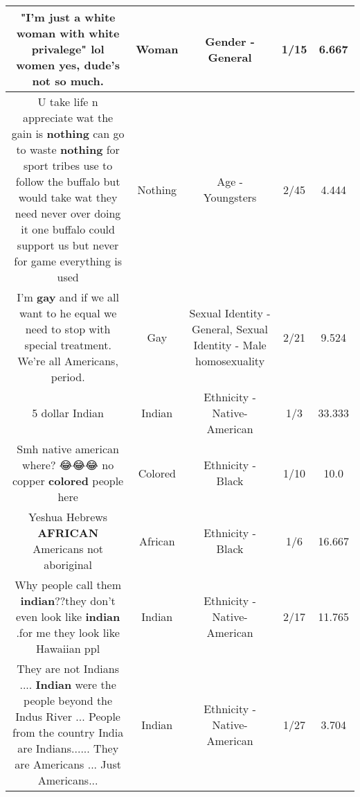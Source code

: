 \documentclass[11pt]{article}
\newlength\mylength
\begin{document}
\begin{center}
\begin{longtable}{|C{.65\mylength}|C{.30\mylength}|C{.12\mylength}|C{.12\mylength}|C{.12\mylength}|}
  \small "I'm just a white \textbf{woman} with white privalege" lol women yes, dude's not so much.\normalsize   & Woman & Gender - General & 1/15 & 6.667 \\  \hline
  \small U take life n appreciate wat the gain is \textbf{nothing} can go to waste \textbf{nothing} for sport tribes use to follow the buffalo but would take wat they need never over doing it one buffalo could support us but never for game everything is used\normalsize   & Nothing & Age - Youngsters & 2/45 & 4.444 \\  \hline
  \small I'm \textbf{g\textbf{ay}} and if we all want to he equal we need to stop with special treatment. We're all Americans, period.\normalsize   & Gay & Sexual Identity - General, Sexual Identity - Male homosexuality & 2/21 & 9.524 \\  \hline
  \small 5 dollar Indian\normalsize   & Indian & Ethnicity - Native-American & 1/3 & 33.333 \\  \hline
  \small Smh native american where? 😂😂😂 no copper \textbf{colored} people here\normalsize   & Colored & Ethnicity - Black & 1/10 & 10.0 \\  \hline
  \small Yeshua Hebrews \textbf{AFRICAN} Americans not aboriginal\normalsize   & African & Ethnicity - Black & 1/6 & 16.667 \\  \hline
  \small Why people call them \textbf{indian}??they don't even look like \textbf{indian} .for me they look like Hawaiian ppl\normalsize   & Indian & Ethnicity - Native-American & 2/17 & 11.765 \\  \hline
  \small They are not Indians .... \textbf{Indian} were the people beyond the Indus River ... People from the country India are Indians...... They are Americans ... Just Americans...\normalsize   & Indian & Ethnicity - Native-American & 1/27 & 3.704 \\  \hline

\end{longtable}
\end{center}
\end{document}
